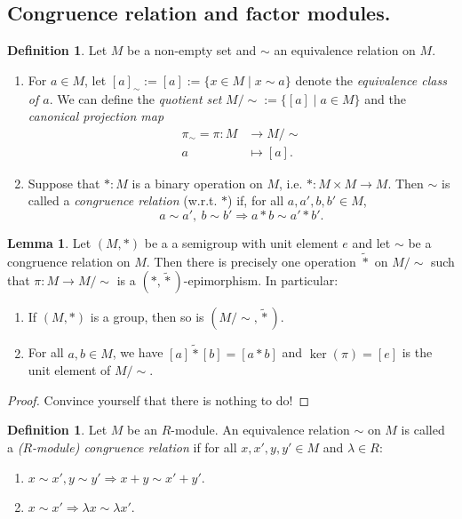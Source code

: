 \documentclass[12pt,a4paper]{report}
\theoremstyle{definition}
\newtheorem{lemma}[theorem]{Lemma}
\newtheorem{defn}[theorem]{Definition}
\theoremstyle{num.custom-title}
\DeclareMathOperator{\imp}{\Rightarrow}
\begin{document}
\subsection{Congruence relation and factor modules.}

\begin{defn}
Let $M$ be a non-empty set and $\sim$ an equivalence relation on $M$.
\begin{enumerate}
\item For $a \in M$, let $[a]_\sim := [a] := \{x \in M \mid x \sim a\}$ denote the \emph{equivalence class of $a$}. We can define the \emph{quotient set} $M/\sim := \{[a] \mid a \in M\}$ and the \emph{canonical projection map}
\begin{align*}
\pi_\sim = \pi : M &\to M/\sim \\
a &\mapsto [a].
\end{align*}
\item Suppose that $*: M$ is a binary operation on $M$, i.e. $*: M \times M \to M$. Then $\sim$ is called a \emph{congruence relation} (w.r.t. $*$) if, for all $a,a',b,b' \in M$,
\[
a \sim a', \ b \sim b' \imp a*b \sim a'*b'.
\]
\end{enumerate}
\end{defn}

\begin{lemma}\label{lemma_operation_on_factor}
Let $(M,*)$ be a a semigroup with unit element $e$ and let $\sim$ be a congruence relation on $M$. Then there is precisely one operation $\tilde{*}$ on $M/{\sim}$ such that $\pi : M \to M/{\sim}$ is a $(*,\tilde{*})$-epimorphism. In particular:
\begin{enumerate}
\item If $(M,*)$ is a group, then so is $(M/{\sim},\tilde{*})$.
\item For all $a,b \in M$, we have $[a] \tilde{*} [b] = [a*b]$ and $\ker(\pi) = [e]$ is the unit element of $M/{\sim}$.
\end{enumerate}
\begin{proof}
Convince yourself that there is nothing to do!
\end{proof}
\end{lemma}

\begin{defn}
Let $M$ be an $R$-module. An equivalence relation $\sim$ on $M$ is called a \emph{($R$-module) congruence relation} if for all $x,x',y,y' \in M$ and $\lambda \in R$:
\begin{enumerate}
\item $x \sim x', y \sim y' \imp x+y \sim x'+y'$.
\item $x \sim x' \imp \lambda x \sim \lambda x'$.
\end{enumerate}
\end{defn}
\end{document}
